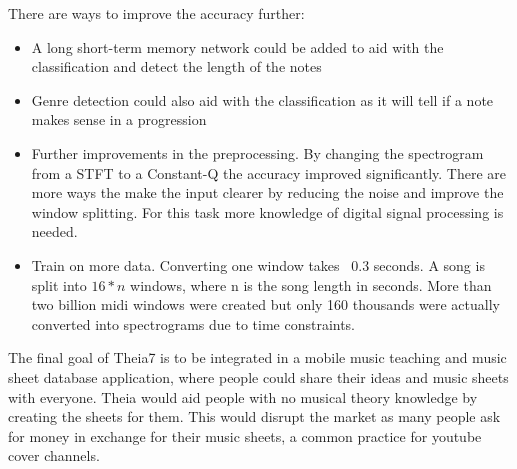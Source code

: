 There are ways to improve the accuracy further:

\begin{itemize}
	\item A long short-term memory network could be added to aid with the classification and detect the length of the notes
	\item Genre detection could also aid with the classification as it will tell if a note makes sense in a progression
	\item Further improvements in the preprocessing. By changing the spectrogram from a STFT to a Constant-Q the accuracy improved significantly. There are more ways the make the input clearer by reducing the noise and improve the window splitting. For this task more knowledge of digital signal processing is needed.
	\item Train on more data. Converting one window takes ~0.3 seconds. A song is split into $16*n$ windows, where n is the song length in seconds. More than two billion midi windows were created but only 160 thousands were actually converted into spectrograms due to time constraints.
\end{itemize}

The final goal of Theia7 is to be integrated in a mobile music teaching and music sheet database application, where people could share their ideas and music sheets with everyone. Theia would aid people with no musical theory knowledge by creating the sheets for them. This would disrupt the market as many people ask for money in exchange for their music sheets, a common practice for youtube cover channels.
